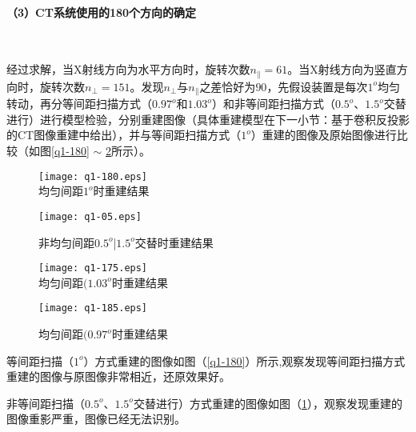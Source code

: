 \documentclass[withoutpreface,bwprint]{cumcmthesis} %
\begin{document}
\paragraph*{（3）CT系统使用的180个方向的确定}~\\

\par 经过求解，当X射线方向为水平方向时，旋转次数$n_{\parallel}=61$。当X射线方向为竖直方向时，旋转次数$n_{\perp}=151$。发现$n_{\perp}$与$n_{\parallel}$之差恰好为$90$，先假设装置是每次$1^o$均匀转动，再分等间距扫描方式（$0.97^o$和$1.03^o$）和非等间距扫描方式（$0.5^o$、$1.5^o$交替进行）进行模型检验，分别重建图像（具体重建模型在下一小节：基于卷积反投影的CT图像重建中给出），并与等间距扫描方式（$1^o$）重建的图像及原始图像进行比较（如图\ref{q1-180} $\sim$ \ref{q1-185}所示）。
\begin{figure}[!htbp]  
\begin{minipage}[t]{0.5\textwidth}
\centering  
\texttt{[image: q1-180.eps]} \\
\caption{均匀间距$1^o$时重建结果} \label{q1-180}
\end{minipage}
\hspace{1ex}
\begin{minipage}[t]{0.5\textwidth}  
\centering  
\texttt{[image: q1-05.eps]}\\
\caption{非均匀间距$0.5^o$|$1.5^o$交替时重建结果}  \label{q1-05}
\end{minipage}  
\end{figure} 

\begin{figure}[!htbp]  
\begin{minipage}[t]{0.5\textwidth}
\centering  
\texttt{[image: q1-175.eps]} \\
\caption{均匀间距$(1.03^o$时重建结果} \label{q1-175}
\end{minipage}
\hspace{1ex}
\begin{minipage}[t]{0.5\textwidth}  
\centering  
\texttt{[image: q1-185.eps]}\\
\caption{均匀间距$(0.97^o$时重建结果}  \label{q1-185}
\end{minipage}  
\end{figure} 

等间距扫描（$1^o$）方式重建的图像如图（\ref{q1-180}）所示,观察发现等间距扫描方式重建的图像与原图像非常相近，还原效果好。


非等间距扫描（$0.5^o$、$1.5^o$交替进行）方式重建的图像如图（\ref{q1-05}），观察发现重建的图像重影严重，图像已经无法识别。
\end{document}
